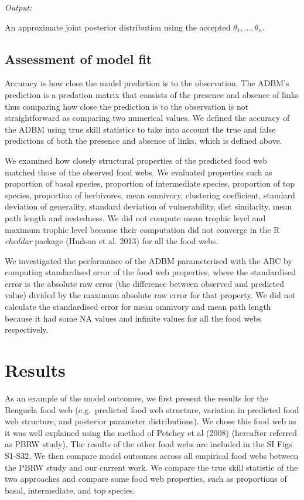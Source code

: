 \documentclass{article}
\begin{document}
\emph{Output:}

An approximate joint posterior distribution using the accepted
\(\theta_1, \dots, \theta_n\).

\hypertarget{assessment-of-model-fit}{%
\subsection{Assessment of model fit}\label{assessment-of-model-fit}}

Accuracy is how close the model prediction is to the observation. The
ADBM's prediction is a predation matrix that consists of the presence
and absence of links thus comparing how close the prediction is to the
observation is not straightforward as comparing two numerical values. We
defined the accuracy of the ADBM using true skill statistics to take
into account the true and false predictions of both the presence and
absence of links, which is defined above.

We examined how closely structural properties of the predicted food web
matched those of the observed food webs. We evaluated properties such as
proportion of basal species, proportion of intermediate species,
proportion of top species, proportion of herbivores, mean omnivory,
clustering coefficient, standard deviation of generality, standard
deviation of vulnerability, diet similarity, mean path length and
nestedness. We did not compute mean trophic level and maximum trophic
level because their computation did not converge in the R \emph{cheddar}
package (Hudson et al. 2013) for all the food webs.

We investigated the performance of the ADBM parameterised with the ABC
by computing standardised error of the food web properties, where the
standardised error is the absolute raw error (the difference between
observed and predicted value) divided by the maximum absolute raw error
for that property. We did not calculate the standardised error for mean
omnivory and mean path length because it had some NA values and infinite
values for all the food webs respectively.

\hypertarget{results}{%
\section{Results}\label{results}}

As an example of the model outcomes, we first present the results for
the Benguela food web (e.g.~predicted food web structure, variation in
predicted food web structure, and posterior parameter distributions). We
chose this food web as it was well explained using the method of Petchey
et al (2008) (hereafter referred as PBRW study). The results of the
other food webs are included in the SI Figs S1-S32. We then compare
model outcomes across all empirical food webs between the PBRW study and
our current work. We compare the true skill statistic of the two
approaches and compare some food web properties, such as proportions of
basal, intermediate, and top species.
\end{document}
